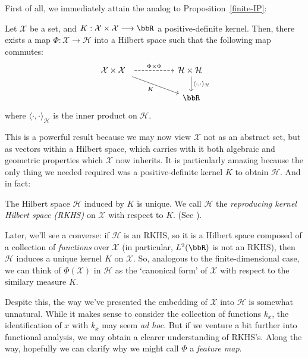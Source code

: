 \documentclass[twoside,11pt]{homework}
\renewcommand{\to}{\longrightarrow}
\begin{document}
\begin{multicols}{2}
First of all, we immediately attain the analog to Proposition~\ref{finite-IP}:

\begin{proposition}[Moore]
  Let $\mathcal{X}$ be a set, and $K: \mathcal{X} \times \mathcal{X} \to \bbR$ a positive-definite kernel. Then, there exists a map $\Phi: \mathcal{X} \to \mathcal{H}$ into a Hilbert space such that the following map commutes:
    \[\begin{tikzcd}
\mathcal{X} \times \mathcal{X}\ \  \arrow[dashed, rr, "\Phi \times \Phi"] \arrow[drr, "K"'] & & \mathcal{H}\times \mathcal{H} \ \arrow[d, "{\langle\cdot,\cdot \rangle_\mathcal{H}}"] \\
& & \bbR
\end{tikzcd}
    \]
    where $\langle \cdot, \cdot\rangle_\mathcal{H}$ is the inner product on $\mathcal{H}$.
\end{proposition}
This is a powerful result because we may now view $\mathcal{X}$ not as an abstract set, but as vectors within a Hilbert space, which carries with it both algebraic and geometric properties which $\mathcal{X}$ now inherits. It is particularly amazing because the only thing we needed required was a positive-definite kernel $K$ to obtain $\mathcal{H}$. And in fact:
\begin{fact}
  The Hilbert space $\mathcal{H}$ induced by $K$ is unique. We call $\mathcal{H}$ the \emph{reproducing kernel Hilbert space (RKHS)} on $\mathcal{X}$ with respect to $K$. (See \cite[Prop 3.3]{P2009}).
\end{fact}

Later, we'll see a converse: if $\mathcal{H}$ is an RKHS, so it is a Hilbert space composed of a collection of \emph{functions} over $\mathcal{X}$ (in particular, $L^2(\bbR)$ is not an RKHS), then $\mathcal{H}$ induces a unique kernel $K$ on $\mathcal{X}$. So, analogous to the finite-dimensional case, we can think of $\Phi(\mathcal{X})$ in $\mathcal{H}$ as the `canonical form' of $\mathcal{X}$ with respect to the similary measure $K$.



Despite this, the way we've presented the embedding of $\mathcal{X}$ into $\mathcal{H}$ is somewhat unnatural. While it makes sense to consider the collection of functions $k_x$, the identification of $x$ with $k_x$ may seem \emph{ad hoc}. But if we venture a bit further into functional analysis, we may obtain a clearer understanding of RKHS's. Along the way, hopefully we can clarify why we might call $\Phi$ a \emph{feature map}.


\end{multicols}
\end{document}
